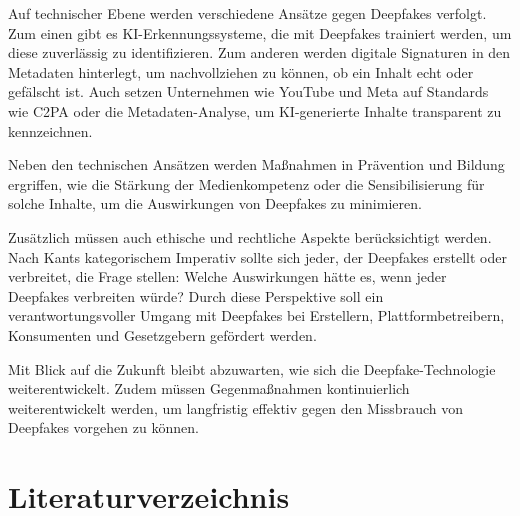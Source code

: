 \documentclass[a4paper,12pt]{article}
\begin{document}
Auf technischer Ebene werden verschiedene Ansätze gegen Deepfakes verfolgt. Zum einen gibt es KI-Erkennungssysteme, die mit Deepfakes trainiert werden, um diese zuverlässig zu identifizieren. 
Zum anderen werden digitale Signaturen in den Metadaten hinterlegt, um nachvollziehen zu können, ob ein Inhalt echt oder gefälscht ist.
Auch setzen Unternehmen wie YouTube und Meta auf Standards wie C2PA oder die Metadaten-Analyse, um KI-generierte Inhalte transparent zu kennzeichnen.

Neben den technischen Ansätzen werden Maßnahmen in Prävention und Bildung ergriffen, 
wie die Stärkung der Medienkompetenz oder die Sensibilisierung für solche Inhalte, um die Auswirkungen von Deepfakes zu minimieren.

Zusätzlich müssen auch ethische und rechtliche Aspekte berücksichtigt werden. 
Nach Kants kategorischem Imperativ sollte sich jeder, der Deepfakes erstellt oder verbreitet, die Frage stellen: 
Welche Auswirkungen hätte es, wenn jeder Deepfakes verbreiten würde? 
Durch diese Perspektive soll ein verantwortungsvoller Umgang mit Deepfakes bei Erstellern, Plattformbetreibern, Konsumenten und Gesetzgebern gefördert werden.

Mit Blick auf die Zukunft bleibt abzuwarten, wie sich die Deepfake-Technologie weiterentwickelt. 
Zudem müssen Gegenmaßnahmen kontinuierlich weiterentwickelt werden, um langfristig effektiv gegen den Missbrauch von Deepfakes vorgehen zu können.


\newpage
\section*{Literaturverzeichnis}
\end{document}
